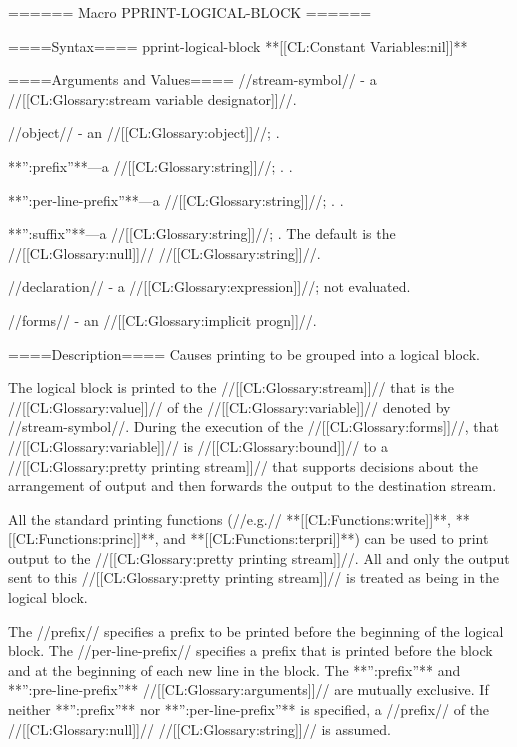 ====== Macro PPRINT-LOGICAL-BLOCK ======

====Syntax====
\DefmacWithValuesNewline pprint-logical-block {} {**[[CL:Constant Variables:nil]]**}

====Arguments and Values====
//stream-symbol// - a //[[CL:Glossary:stream variable designator]]//.

//object// - an //[[CL:Glossary:object]]//; \eval.

**'':prefix''**---a //[[CL:Glossary:string]]//; \eval. \HairyDefault.

**'':per-line-prefix''**---a //[[CL:Glossary:string]]//; \eval. \HairyDefault.

**'':suffix''**---a //[[CL:Glossary:string]]//; \eval. The default is the //[[CL:Glossary:null]]// //[[CL:Glossary:string]]//.

//declaration// - a  //[[CL:Glossary:expression]]//; not evaluated.

//forms// - an //[[CL:Glossary:implicit progn]]//.

====Description====
Causes printing to be grouped into a logical block.

The logical block is printed to the //[[CL:Glossary:stream]]// that is the //[[CL:Glossary:value]]// of the //[[CL:Glossary:variable]]// denoted by //stream-symbol//. During the execution of the //[[CL:Glossary:forms]]//, that //[[CL:Glossary:variable]]// is //[[CL:Glossary:bound]]// to a //[[CL:Glossary:pretty printing stream]]// that supports decisions about the arrangement of output and then forwards the output to the destination stream.

All the standard printing functions (//e.g.// **[[CL:Functions:write]]**, **[[CL:Functions:princ]]**, and **[[CL:Functions:terpri]]**) can be used to print output to the //[[CL:Glossary:pretty printing stream]]//. All and only the output sent to this //[[CL:Glossary:pretty printing stream]]// is treated as being in the logical block.

The //prefix// specifies a prefix to be printed before the beginning of the logical block. The //per-line-prefix// specifies a prefix that is printed before the block and at the beginning of each new line in the block. The **'':prefix''** and **'':pre-line-prefix''** //[[CL:Glossary:arguments]]// are mutually exclusive. If neither **'':prefix''** nor **'':per-line-prefix''** is specified, a //prefix// of the //[[CL:Glossary:null]]// //[[CL:Glossary:string]]// is assumed.


